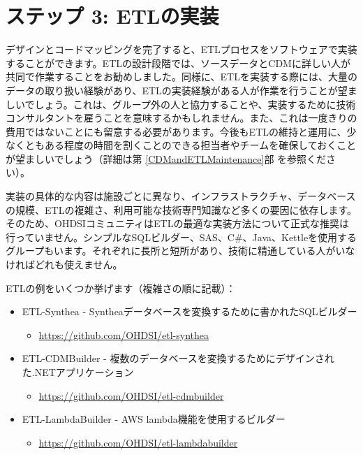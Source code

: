 \documentclass[
  11pt]{book}
\providecommand{\tightlist}{%
  \setlength{\itemsep}{0pt}\setlength{\parskip}{0pt}}
\theoremstyle{definition}
\theoremstyle{definition}
\theoremstyle{definition}
\theoremstyle{definition}
\theoremstyle{remark}
\begin{document}
\section{ステップ 3: ETLの実装}\label{ux30b9ux30c6ux30c3ux30d7-3-etlux306eux5b9fux88c5}

デザインとコードマッピングを完了すると、ETLプロセスをソフトウェアで実装することができます。ETLの設計段階では、ソースデータとCDMに詳しい人が共同で作業することをお勧めしました。同様に、ETLを実装する際には、大量のデータの取り扱い経験があり、ETLの実装経験がある人が作業を行うことが望ましいでしょう。これは、グループ外の人と協力することや、実装するために技術コンサルタントを雇うことを意味するかもしれません。また、これは一度きりの費用ではないことにも留意する必要があります。今後もETLの維持と運用に、少なくともある程度の時間を割くことのできる担当者やチームを確保しておくことが望ましいでしょう（詳細は第 \ref{CDMandETLMaintenance}部 を参照ください）。

実装の具体的な内容は施設ごとに異なり、インフラストラクチャ、データベースの規模、ETLの複雑さ、利用可能な技術専門知識など多くの要因に依存します。そのため、OHDSIコミュニティはETLの最適な実装方法について正式な推奨は行っていません。シンプルなSQLビルダー、SAS、C\#、Java、Kettleを使用するグループもいます。それぞれに長所と短所があり、技術に精通している人がいなければどれも使えません。

ETLの例をいくつか挙げます（複雑さの順に記載）：

\begin{itemize}
\tightlist
\item
  ETL-Synthea - Syntheaデータベースを変換するために書かれたSQLビルダー

  \begin{itemize}
  \tightlist
  \item
    \url{https://github.com/OHDSI/etl-synthea}
  \end{itemize}
\item
  ETL-CDMBuilder - 複数のデータベースを変換するためにデザインされた.NETアプリケーション

  \begin{itemize}
  \tightlist
  \item
    \url{https://github.com/OHDSI/etl-cdmbuilder}
  \end{itemize}
\item
  ETL-LambdaBuilder - AWS lambda機能を使用するビルダー

  \begin{itemize}
  \tightlist
  \item
    \url{https://github.com/OHDSI/etl-lambdabuilder}
  \end{itemize}
\end{itemize}
\end{document}
